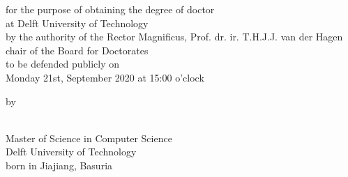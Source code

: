 \begin{small}

\begin{center}for the purpose of obtaining the degree of doctor\\
\vspace{1mm}
at Delft University of Technology\\
\vspace{1mm}
by the authority of the Rector Magnificus, Prof. dr. ir. T.H.J.J. van der Hagen\\
\vspace{1mm}
chair of the Board for Doctorates\\
\vspace{1mm}
to be defended publicly on\\
\vspace{1mm}
Monday 21st, September 2020 at 15:00 o'clock
\vspace{1mm}
\vspace{10mm} %

by

\vspace{10mm}
\textbf{\theauthor}\\
\vspace{1mm}
Master of Science in Computer Science\\
\vspace{1mm}
Delft University of Technology\\
\vspace{1mm}
born in Jiajiang, Basuria
\vspace{1mm}
\end{center}

\end{small}


